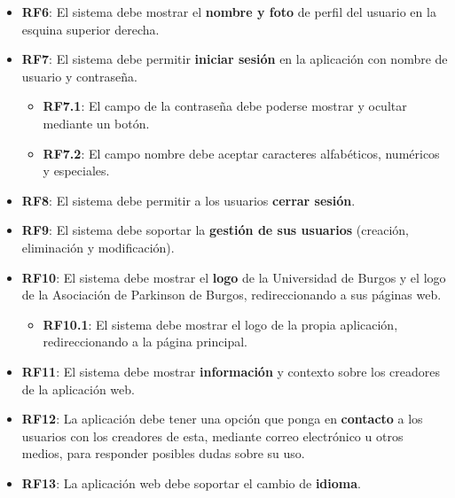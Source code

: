 \begin{itemize}
    
    \item \textbf{RF6}: El sistema debe mostrar el \textbf{nombre y foto} de perfil del usuario en la esquina superior derecha.


    \item \textbf{RF7}: El sistema debe permitir \textbf{iniciar sesión} en la aplicación con nombre de usuario y contraseña.
    \begin{itemize}
            \item \textbf{RF7.1}: El campo de la contraseña debe poderse mostrar y ocultar mediante un botón.
            \item \textbf{RF7.2}: El campo nombre debe aceptar caracteres alfabéticos, numéricos y especiales.
    \end{itemize}


    \item \textbf{RF8}: El sistema debe permitir a los usuarios \textbf{cerrar sesión}.


    \item \textbf{RF9}: El sistema debe soportar la \textbf{gestión de sus usuarios} (creación, eliminación y modificación).

    
    \item \textbf{RF10}: El sistema debe mostrar el \textbf{logo} de la Universidad de Burgos y el logo de la Asociación de Parkinson de Burgos, redireccionando a sus páginas web.
    \begin{itemize}
            \item \textbf{RF10.1}: El sistema debe mostrar el logo de la propia aplicación, redireccionando a la página principal.
    \end{itemize}


    \item \textbf{RF11}: El sistema debe mostrar \textbf{información} y contexto sobre los creadores de la aplicación web.


    \item \textbf{RF12}: La aplicación debe tener una opción que ponga en \textbf{contacto} a los usuarios con los creadores de esta, mediante correo electrónico u otros medios, para responder posibles dudas sobre su uso.


    \item \textbf{RF13}: La aplicación web debe soportar el cambio de \textbf{idioma}.
\end{itemize}


